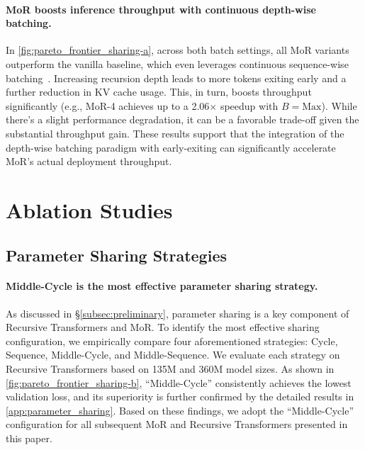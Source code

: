\vspace{-10pt}
\paragraph{MoR boosts inference throughput with continuous depth-wise batching.}


In \autoref{fig:pareto_frontier_sharing-a}, across both batch settings, all MoR variants outperform the vanilla baseline, which even leverages continuous sequence-wise batching~\citep{yu2022orca, kwon2023efficient}. Increasing recursion depth leads to more tokens exiting early and a further reduction in KV cache usage. This, in turn, boosts throughput significantly (e.g., MoR-4 achieves up to a 2.06$\times$ speedup with $B=\text{Max}$). While there's a slight performance degradation, it can be a favorable trade-off given the substantial throughput gain. These results support that the integration of the depth-wise batching paradigm with early-exiting can significantly accelerate MoR's actual deployment throughput.


\section{Ablation Studies}





\subsection{Parameter Sharing Strategies}
\label{subsec:sharing}


\paragraph{Middle-Cycle is the most effective parameter sharing strategy.}

As discussed in \S\ref{subsec:preliminary}, parameter sharing is a key component of Recursive Transformers and MoR. To identify the most effective sharing configuration, we empirically compare four aforementioned strategies: Cycle, Sequence, Middle-Cycle, and Middle-Sequence. We evaluate each strategy on Recursive Transformers based on 135M and 360M model sizes. As shown in \autoref{fig:pareto_frontier_sharing-b}, ``Middle-Cycle'' consistently achieves the lowest validation loss, and its superiority is further confirmed by the detailed results in \autoref{app:parameter_sharing}. Based on these findings, we adopt the ``Middle-Cycle'' configuration for all subsequent MoR and Recursive Transformers presented in this paper.


